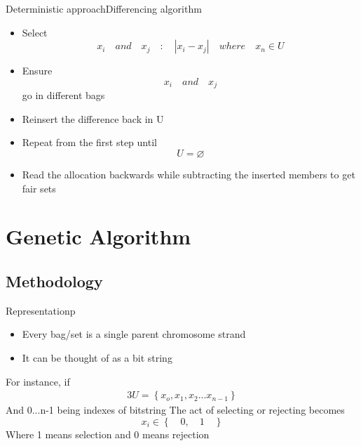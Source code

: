 \documentclass{beamer}
\begin{document}
\begin{frame}{Deterministic approach}{Differencing algorithm}
  \begin{centering}
    \begin{itemize}
    \item Select $$x_i\quad and\quad x_j\quad :\quad | x_i - x_j |\quad where\quad  x_n \in U$$
      \pause
    \item Ensure $$x_i\quad and\quad x_j$$ go in different bags
      \pause
    \item Reinsert the difference back in U
      \pause
    \item Repeat from the first step until $$U = \varnothing$$
      \pause
    \item Read the allocation backwards while subtracting the inserted members to get fair sets
    \end{itemize}
    \pause
  \end{centering}
\end{frame}

\section{Genetic Algorithm}

\subsection{Methodology}

\begin{frame}{Representation}p
  \begin{itemize}
  \item Every bag/set is a single parent chromosome strand
    \pause
  \item It can be thought of as a bit string
  \end{itemize}
  \pause
  For instance, if
  \begin{alignat}{3}
    U = \left \{ x_o, x_1, x_2 ... x_{n-1} \right \} 
  \end{alignat}
  And 0...n-1 being indexes of bitstring
  The act of selecting or rejecting becomes $$ x_i \in \left \{\quad 0,\quad 1\quad\right \}$$
  Where 1 means selection and 0 means rejection
\end{frame}
\end{document}
